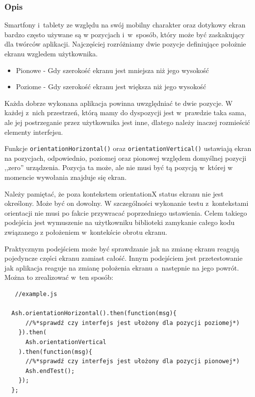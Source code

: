 \documentclass[brudnopis]{xmgr}
\begin{document}
\subsubsection{Opis}

Smartfony i~tablety ze względu na swój mobilny charakter oraz dotykowy ekran bardzo często używane są w pozycjach i~w~sposób, który może być zaskakujący dla twórców aplikacji. Najczęściej rozróżniamy dwie pozycje definiujące położnie ekranu wzgledem użytkownika. 

\begin{itemize}
  \item Pionowe - Gdy szerokość ekranu jest mniejsza niż jego wysokość
  \item Poziome - Gdy szerokość ekranu jest większa niż jego wysokość
\end{itemize}

Każda dobrze wykonana aplikacja powinna uwzględniać te dwie pozycje. W każdej z~nich przestrzeń, którą mamy do dyspozycji jest w~prawdzie taka sama, ale jej postrzeganie przez użytkownika jest inne, dlatego należy inaczej rozmieścić elementy interfejsu.  

Funkcje \texttt{orientationHorizontal()} oraz \texttt{orientationVertical()} ustawiają ekran na pozycjach, odpowiednio, poziomej oraz pionowej względem domyślnej pozycji ,,zero'' urządzenia. Pozycja ta może, ale nie musi być tą pozycją w~której w momencie wywołania znajduje się ekran.  

Należy pamiętać, że poza kontekstem orientationX status ekranu nie jest określony. Może być on dowolny. W szczególności wykonanie testu z~kontekstami orientacji nie musi po fakcie przywracać poprzedniego ustawienia. Celem takiego podejścia jest wymuszenie na użytkowniku biblioteki zamykanie całego kodu związanego z położeniem w~kontekście obrotu ekranu. 

Praktycznym podejściem może być sprawdzanie jak na zmianę ekranu reagują pojedyncze części ekranu zamiast całość. Innym podejściem jest przetestowanie jak aplikacja reaguje na zmianę położenia ekranu a~następnie na jego powrót. Można to zrealizować w~ten sposób:

\begin{lstlisting}
   //example.js

  Ash.orientationHorizontal().then(function(msg){
      //%*sprawdź czy interfejs jest ułożony dla pozycji poziomej*)
    }).then(
      Ash.orientationVertical
    ).then(function(msg){
      //%*sprawdź czy interfejs jest ułożony dla pozycji pionowej*)
      Ash.endTest();
    });
  };
\end{lstlisting}
\end{document}
